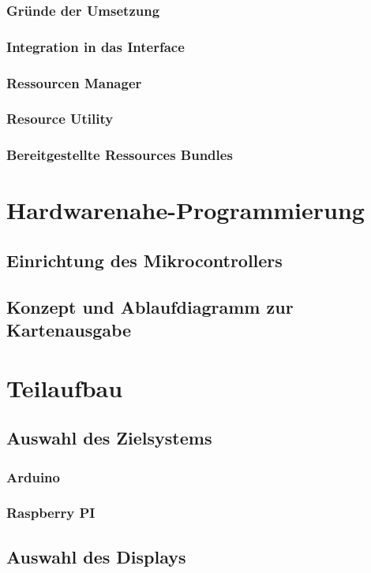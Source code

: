 \subsubsection{Gründe der Umsetzung}
\subsubsection{Integration in das Interface}
\subsubsection{Ressourcen Manager}
\subsubsection{Resource Utility}
\subsubsection{Bereitgestellte Ressources Bundles}

\section{Hardwarenahe-Programmierung}
\subsection{Einrichtung des Mikrocontrollers}
\subsection{Konzept und Ablaufdiagramm zur Kartenausgabe} \label{ssec:konzeptCardDeal}
\section{Teilaufbau}
\subsection{Auswahl des Zielsystems}
\subsubsection{Arduino}
\subsubsection{Raspberry PI}
\subsection{Auswahl des Displays}
